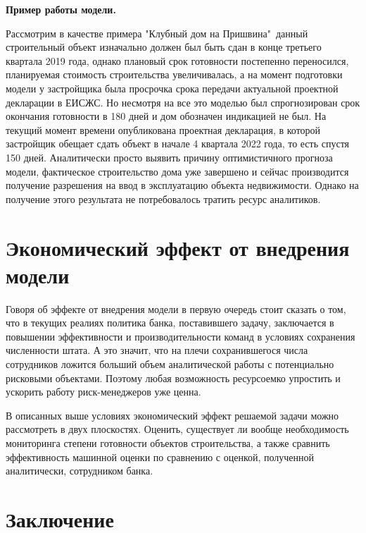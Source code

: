 \documentclass[12pt,a4paper]{article} %
\begin{document}
\textbf{Пример работы модели.}

Рассмотрим в качестве примера "Клубный дом на Пришвина"\ данный строительный объект изначально должен был быть сдан в конце третьего квартала 2019 года, однако плановый срок готовности постепенно переносился, планируемая стоимость строительства увеличивалась, а на момент подготовки модели у застройщика была просрочка срока передачи актуальной проектной декларации в ЕИСЖС. Но несмотря на все это моделью был спрогнозирован срок окончания готовности в 180 дней и дом обозначен индикацией не был. На текущий момент времени опубликована проектная декларация, в которой застройщик обещает сдать объект в начале 4 квартала 2022 года, то есть спустя 150 дней. Аналитически просто выявить причину оптимистичного прогноза модели, фактическое строительство дома уже завершено и сейчас производится получение разрешения на ввод в эксплуатацию объекта недвижимости. Однако на получение этого результата не потребовалось тратить ресурс аналитиков.


\newpage
\section{Экономический эффект от внедрения модели}
Говоря об эффекте от внедрения модели в первую очередь стоит сказать о том, что в текущих реалиях политика банка, поставившего задачу, заключается в повышении эффективности и производительности команд в условиях сохранения численности штата. А это значит, что на плечи сохранившегося числа сотрудников ложится больший объем аналитической работы с потенциально рисковыми объектами. Поэтому любая возможность ресурсоемко упростить и ускорить работу риск-менеджеров уже ценна.

В описанных выше условиях экономический эффект решаемой задачи можно рассмотреть в двух плоскостях. Оценить, существует ли вообще необходимость мониторинга степени готовности объектов строительства, а также сравнить эффективность  машинной оценки по сравнению с оценкой, полученной аналитически, сотрудником банка.







\newpage
\section{Заключение}
\end{document}
